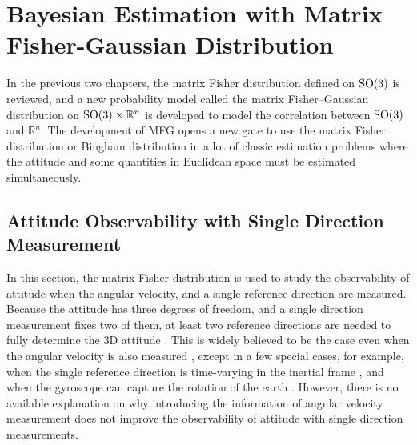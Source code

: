 
\chapter{Bayesian Estimation with Matrix Fisher-Gaussian Distribution} \label{chap:estimation}

In the previous two chapters, the matrix Fisher distribution defined on $\mathrm{SO}(3)$ is reviewed, and a new probability model called the matrix Fisher--Gaussian distribution on $\mathrm{SO}(3)\times \mathbb{R}^n$ is developed to model the correlation between $\mathrm{SO}(3)$ and $\mathbb{R}^n$.
The development of MFG opens a new gate to use the matrix Fisher distribution or Bingham distribution in a lot of classic estimation problems where the attitude and some quantities in Euclidean space must be estimated simultaneously.

\section{Attitude Observability with Single Direction Measurement} \label{section:observability}

In this section, the matrix Fisher distribution is used to study the observability of attitude when the angular velocity, and a single reference direction are measured.
Because the attitude has three degrees of freedom, and a single direction measurement fixes two of them, at least two reference directions are needed to fully determine the 3D attitude \cite{markley1988attitude,shuster1981three}.
This is widely believed to be the case even when the angular velocity is also measured \cite{mahony2008nonlinear}, except in a few special cases, for example, when the single reference direction is time-varying in the inertial frame \cite{batista2012ges,grip2011attitude,lee2007global}, and when the gyroscope can capture the rotation of the earth \cite{reis2018nonlinear}.
However, there is no available explanation on why introducing the information of angular velocity measurement does not improve the observability of attitude with single direction measurements.

